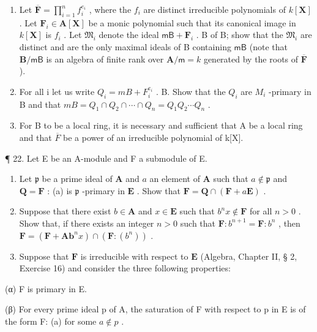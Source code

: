 \begin{enumerate}
\def\labelenumi{(\alph{enumi})}
\item
  Let \(\overline{\mathbf{F}} = \prod_{i=1}^{n} f_i^{e_i}\) , where the \(f_i\) are distinct irreducible polynomials of \(k[\mathbf{X}]\) . Let \(\mathbf{F}_i \in \mathbf{A}[\mathbf{X}]\) be a monic polynomial such that its canonical image in \(k[\mathbf{X}]\) is \(f_i\) . Let \(\mathfrak{M}_i\) denote the ideal \(\mathsf{mB} + \mathbf{F}_i\) . B of B; show that the \(\mathfrak{M}_i\) are distinct and are the only maximal ideals of B containing \(\mathsf{mB}\) (note that \(\mathbf{B}/\mathsf{mB}\) is an algebra of finite rank over \(\mathbf{A}/\mathsf{m} = k\) generated by the roots of \(\overline{\mathbf{F}}\) ).
\item
  For all i let us write \(Q_{i} = mB + F_{i}^{e_{i}}\) . B. Show that the \(Q_{i}\) are \(M_{i}\) -primary in B and that \(mB = Q_{1} \cap Q_{2} \cap \cdots \cap Q_{n} = Q_{1}Q_{2} \cdots Q_{n}\) .
\item
  For B to be a local ring, it is necessary and sufficient that A be a local ring and that \(\overline{F}\) be a power of an irreducible polynomial of k{[}X{]}.
\end{enumerate}

¶ 22. Let E be an A-module and F a submodule of E.

\begin{enumerate}
\def\labelenumi{(\alph{enumi})}
\item
  Let \(\mathfrak{p}\) be a prime ideal of \(\mathbf{A}\) and \(a\) an element of \(\mathbf{A}\) such that \(a \notin \mathfrak{p}\) and \(\mathbf{Q} = \mathbf{F}\) : (a) is \(\mathfrak{p}\) -primary in \(\mathbf{E}\) . Show that \(\mathbf{F} = \mathbf{Q} \cap (\mathbf{F} + a\mathbf{E})\) .
\item
  Suppose that there exist \(b \in \mathbf{A}\) and \(x \in \mathbf{E}\) such that \(b^n x \notin \mathbf{F}\) for all \(n > 0\) . Show that, if there exists an integer \(n > 0\) such that \(\mathbf{F}: b^{n+1} = \mathbf{F}: b^n\) , then \(\mathbf{F} = (\mathbf{F} + \mathbf{Ab}^n x) \cap (\mathbf{F}: (b^n))\) .
\item
  Suppose that \(\mathbf{F}\) is irreducible with respect to \(\mathbf{E}\) (Algebra, Chapter II, § 2, Exercise 16) and consider the three following properties:
\end{enumerate}

(α) F is primary in E.

(β) For every prime ideal p of A, the saturation of F with respect to p in E is of the form F: (a) for some \(a \notin p\) .

